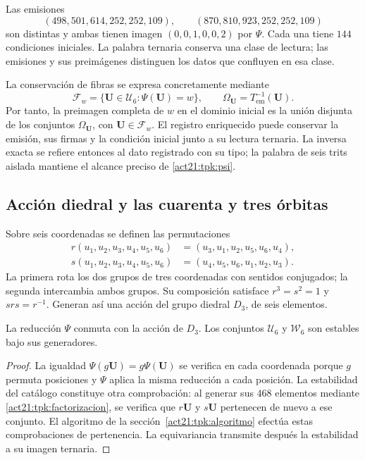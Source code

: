 \begin{example}
\label{act21:tpk:colision}
Las emisiones
\[
 (498,501,614,252,252,109),\qquad
 (870,810,923,252,252,109)
\]
son distintas y ambas tienen imagen \((0,0,1,0,0,2)\) por \(\Psi\).
Cada una tiene \(144\) condiciones iniciales. La palabra ternaria conserva
una clase de lectura; las emisiones y sus preimágenes distinguen los datos
que confluyen en esa clase.
\end{example}

La conservación de fibras se expresa concretamente mediante
\[
 \mathcal F_w=\{\mathbf U\in\mathcal U_6:\Psi(\mathbf U)=w\},
 \qquad
 \Omega_{\mathbf U}=T_{\mathrm{em}}^{-1}(\mathbf U).
\]
Por tanto, la preimagen completa de \(w\) en el dominio inicial es la
unión disjunta de los conjuntos \(\Omega_{\mathbf U}\), con
\(\mathbf U\in\mathcal F_w\). El registro enriquecido puede conservar la
emisión, sus firmas y la condición inicial junto a su lectura ternaria.
La inversa exacta se refiere entonces al dato registrado con su tipo;
la palabra de seis trits aislada mantiene el alcance preciso de
\eqref{act21:tpk:psi}.

\subsection{Acción diedral y las cuarenta y tres órbitas}
\label{act21:tpk:orbitas}

Sobre seis coordenadas se definen las permutaciones
\begin{align}
 r(u_1,u_2,u_3,u_4,u_5,u_6)
   &=(u_3,u_1,u_2,u_5,u_6,u_4),\\
 s(u_1,u_2,u_3,u_4,u_5,u_6)
   &=(u_4,u_5,u_6,u_1,u_2,u_3).
 \label{act21:tpk:generadores-diedrales}
\end{align}
La primera rota los dos grupos de tres coordenadas con sentidos conjugados;
la segunda intercambia ambos grupos. Su composición satisface
\(r^3=s^2=1\) y \(srs=r^{-1}\). Generan así una acción del grupo diedral
\(D_3\), de seis elementos.

\begin{proposition}
\label{act21:tpk:equivarianza}
La reducción \(\Psi\) conmuta con la acción de \(D_3\). Los conjuntos
\(\mathcal U_6\) y \(\mathcal W_6\) son estables bajo sus generadores.
\end{proposition}
\begin{proof}
La igualdad \(\Psi(g\mathbf U)=g\Psi(\mathbf U)\) se verifica en cada
coordenada porque \(g\) permuta posiciones y \(\Psi\) aplica la misma
reducción a cada posición. La estabilidad del catálogo constituye otra
comprobación: al generar sus \(468\) elementos mediante
\eqref{act21:tpk:factorizacion}, se verifica que \(r\mathbf U\) y
\(s\mathbf U\) pertenecen de nuevo a ese conjunto. El algoritmo de la
sección~\ref{act21:tpk:algoritmo} efectúa estas comprobaciones de pertenencia.
La equivariancia transmite después la estabilidad a su imagen ternaria.
\end{proof}

